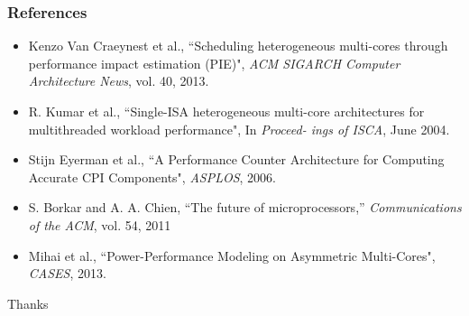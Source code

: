 \documentclass{beamer}
\begin{document}
\begin{frame}
\frametitle{References}
\begin{itemize}
\small
\item {Kenzo Van Craeynest et al., ``Scheduling heterogeneous multi-cores through performance impact estimation (PIE)", \textit{ACM SIGARCH Computer Architecture News}, vol. 40, 2013.}
\item {R. Kumar et al., ``Single-ISA heterogeneous multi-core architectures for multithreaded workload performance", In \textit{Proceed-
ings of ISCA}, June 2004.}
\item {Stijn Eyerman et al., ``A Performance Counter Architecture for Computing Accurate CPI Components", \textit{ASPLOS}, 2006}.
\item {S. Borkar and A. A. Chien, “The future of microprocessors,” \textit{Communications of the ACM}, vol. 54, 2011}
\item Mihai et al., ``Power-Performance Modeling on Asymmetric Multi-Cores", \textit{CASES}, 2013.
\end{itemize}
\end{frame}

\begin{frame}
\Huge{\centerline{Thanks}}
\end{frame}
\end{document}
